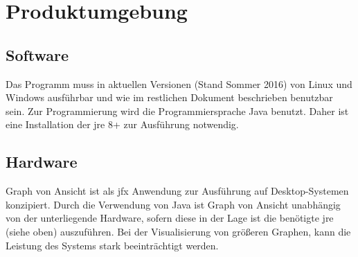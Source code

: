 \chapter{Produktumgebung}

\section{Software}
Das Programm muss in aktuellen Versionen (Stand Sommer 2016) von Linux und Windows ausführbar und wie im restlichen Dokument beschrieben benutzbar sein.
Zur Programmierung wird die Programmiersprache Java benutzt. Daher ist eine Installation der \gls{jre} 8+ zur Ausführung notwendig.

\section{Hardware}
Graph von Ansicht ist als \gls{jfx} Anwendung zur Ausführung auf Desktop-Systemen konzipiert.
Durch die Verwendung von Java ist Graph von Ansicht unabhängig von der unterliegende Hardware, sofern diese in der Lage ist die benötigte \gls{jre} (siehe oben) auszuführen.
Bei der Visualisierung von größeren Graphen, kann die Leistung des Systems stark beeinträchtigt werden.

